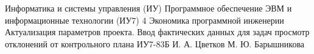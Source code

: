 \makereporttitle
{Информатика и системы управления (ИУ)}
{Программное обеспечение ЭВМ и информационные технологии (ИУ7)}
{4}
{Экономика программной инженерии}
{Актуализация параметров проекта. Ввод фактических данных для задач просмотр отклонений от контрольного плана}
{}
{ИУ7-83Б}
{И. А. Цветков}
{М. Ю. Барышникова}
{}
{}
